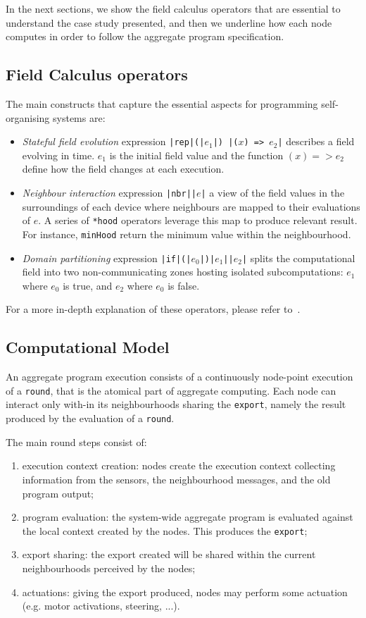 \documentclass[conference]{IEEEtran}
\newcommand{\round}{\texttt{round}}
\newcommand{\export}{\texttt{export}}
\begin{document}
In the next sections, we show the field calculus operators that are essential to understand the case study presented,
 and then we underline how each node computes in order to follow the aggregate program specification.
\subsection{Field Calculus operators}
The main constructs that capture the essential aspects for programming self-organising systems are:
\begin{itemize}
  \item \textit{Stateful field evolution} expression \texttt{|{\color{teal}rep}|(|$e_1$|) {|($x$) => $e_2$|}} describes a field evolving in time. 
  $e_1$ is the initial field value and the function $(x) => e_2$ define how the field changes at each execution.
  \item \textit{Neighbour interaction} expression \texttt{|\color{teal}nbr|{|$e$|}} a view
  of the field values in the surroundings of each device where neighbours are
  mapped to their evaluations of $e$. A series of \texttt{*hood} operators leverage this map to produce relevant result. 
  For instance, \texttt{minHood} return the minimum value 
  within the neighbourhood.
  \item \textit{Domain partitioning} expression \texttt{|\color{teal}if|(|$e_0$|){|$e_1$|}{|$e_2$|}} splits the computational
  field into two non-communicating zones hosting isolated subcomputations:
  $e_1$ where $e_0$ is true, and $e_2$ where $e_0$ is false.
\end{itemize}

For a more in-depth explanation of these operators, please refer to~\cite{DBLP:journals/computer/BealPV15}.
\subsection{Computational Model}
An aggregate program execution consists of a continuously node-point execution of a \round{}, 
 that is the atomical part of aggregate computing.
%
Each node can interact only with-in its neighbourhoods sharing the \export{}, 
 namely the result produced by the evaluation of a \round{}.

The main round steps consist of:
\begin{enumerate}
  \item execution context creation: nodes create the execution context collecting information from the sensors, 
  the neighbourhood messages, and the old program output;
  \item program evaluation: the system-wide aggregate program is evaluated against the local context created by the nodes. 
  This produces the \export{};
  \item export sharing: the export created will be shared within the current neighbourhoods perceived by the nodes;
  \item actuations: giving the export produced, nodes may perform some actuation (e.g. motor activations, steering, ...).
\end{enumerate}
\end{document}

